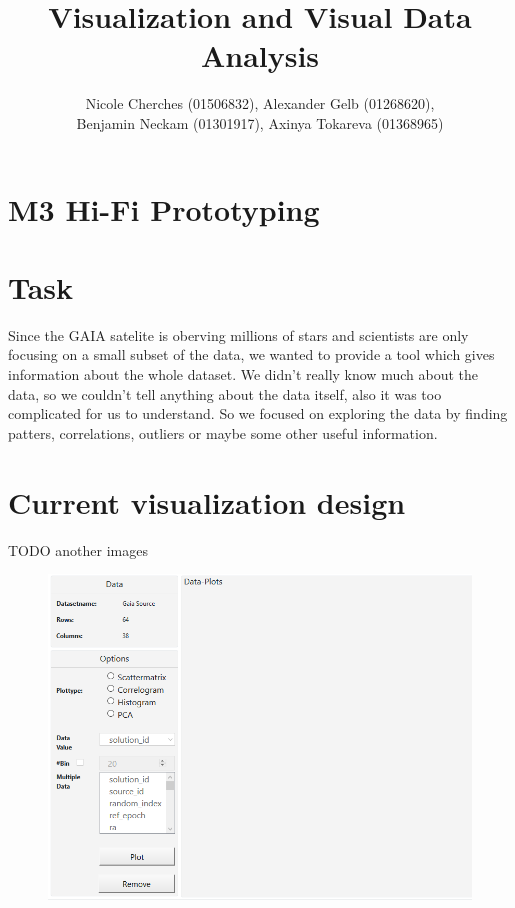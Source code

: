 \documentclass{article}
\begin{document}
\title{Visualization and Visual Data Analysis}
\author{Nicole Cherches (01506832), Alexander Gelb (01268620), \\Benjamin Neckam (01301917), Axinya Tokareva (01368965)}
\maketitle
\section*{M3  Hi-Fi Prototyping}
\section{Task}
Since the GAIA satelite is oberving millions of stars and scientists are only focusing on a small subset of the data, we wanted to provide a tool which gives information about the whole dataset. 
We didn't really know much about the data, so we couldn't tell anything about the data itself, also it was too complicated for us to understand. So we focused on exploring the data by finding patters, correlations, outliers or maybe some other useful information.\\
\section{Current visualization design}
TODO another images
\newpage
\begin{figure}[!h]
\centering
\includegraphics[width=1\textwidth]{images/m3/uebersicht.PNG}
\label{fig1}
\end{figure} 
\end{document}
